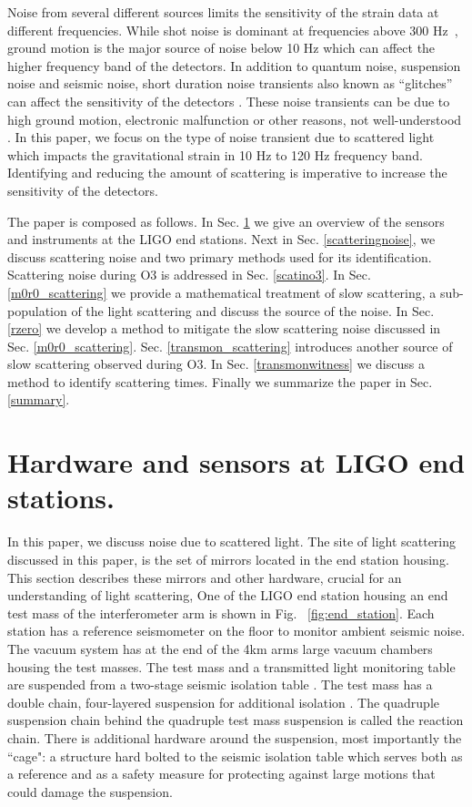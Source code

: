 \documentclass[12pt]{iopart}
\begin{document}
Noise from several different sources limits the sensitivity of the strain data at different frequencies. 
While shot noise is dominant at frequencies above 300 Hz~\cite{tjthesis}, ground motion is the major source of noise below 10 Hz which can affect the higher frequency band of the detectors. In addition to quantum noise, suspension noise and seismic noise, short duration noise transients also known as ``glitches'' can affect the sensitivity of the detectors \cite{transientpaper}. These noise transients can be due to high ground motion, electronic malfunction or other reasons, not well-understood \cite{Nuttall_2018,noisepaper,Cabero_2019}. In this paper, we focus on the type of noise transient due to scattered light which impacts the gravitational strain in 10 Hz to 120 Hz frequency band. Identifying and reducing the amount of scattering is imperative to increase the sensitivity of the detectors. 
 
The paper is composed as follows. In Sec. \ref{hardware} we give an overview of the sensors and instruments at the LIGO end stations. Next in Sec. \ref{scatteringnoise}, we discuss scattering noise and two primary methods used for its identification. Scattering noise during O3 is addressed in Sec. \ref{scatino3}. In Sec. \ref{m0r0_scattering} we provide a mathematical treatment of slow scattering, a sub-population of the light scattering and discuss the source of the noise. In Sec. \ref{rzero} we develop a method to mitigate the slow scattering noise discussed in Sec. \ref{m0r0_scattering}. Sec. \ref{transmon_scattering} introduces another source of slow scattering observed during O3. In Sec. \ref{transmonwitness} we discuss a method to identify scattering times. Finally we summarize the paper in Sec. \ref{summary}. 

\section{Hardware and sensors at LIGO end stations.}\label{hardware} In this paper, we discuss noise due to scattered light. The site of light scattering discussed in this paper, is the set of mirrors located in the end station housing. This section describes these mirrors and other hardware, crucial for an understanding of light scattering,
One of the LIGO end station housing an end test mass \cite{ETM_ref} of the interferometer arm is shown in Fig. ~\ref{fig:end_station}. Each station has a reference seismometer on the floor to monitor ambient seismic noise. The vacuum system has at the end of the 4km arms large vacuum chambers housing the test masses. The test mass and a transmitted light monitoring table are suspended from a two-stage seismic isolation table \cite{Matichard_2015}. The test mass has a double chain, four-layered suspension for additional isolation \cite{Aston_2012}. The quadruple suspension chain behind the quadruple test mass suspension is called the reaction chain. There is additional hardware around the suspension, most importantly the ``cage": a structure hard bolted to the seismic isolation table which serves both as a reference and as a safety measure for protecting against large motions that could damage the suspension.
\end{document}
